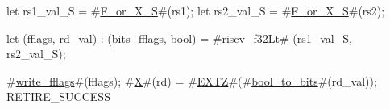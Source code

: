 let rs1_val_S = #\hyperref[sailRISCVzFzyorzyXzyS]{F\_or\_X\_S}#(rs1);
let rs2_val_S = #\hyperref[sailRISCVzFzyorzyXzyS]{F\_or\_X\_S}#(rs2);

let (fflags, rd_val) : (bits_fflags, bool) =
    #\hyperref[sailRISCVzriscvzyf32Lt]{riscv\_f32Lt}# (rs1_val_S, rs2_val_S);

#\hyperref[sailRISCVzwritezyfflags]{write\_fflags}#(fflags);
#\hyperref[sailRISCVzX]{X}#(rd) = #\hyperref[sailRISCVzEXTZ]{EXTZ}#(#\hyperref[sailRISCVzboolzytozybits]{bool\_to\_bits}#(rd_val));
RETIRE_SUCCESS

